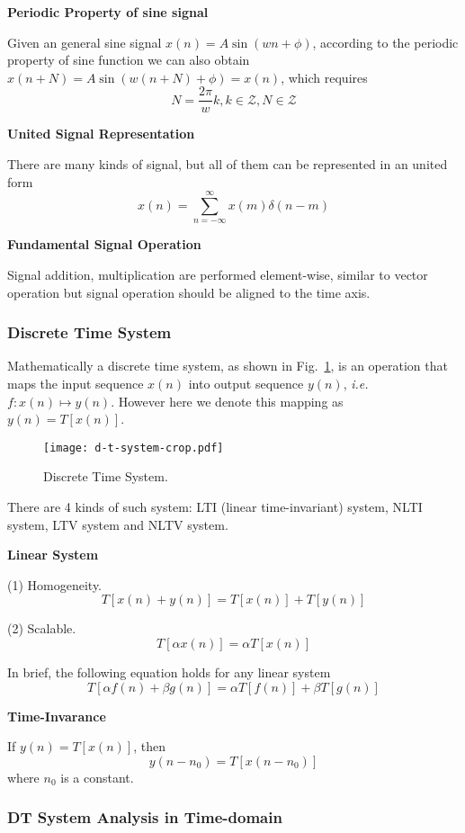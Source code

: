 {\bf Periodic Property of sine signal}

Given an general sine signal $x(n) = A\sin(wn+\phi)$, according to the periodic property
of sine function we can also obtain $x(n+N) = A\sin(w(n+N)+\phi) = x(n)$, which requires
\[ N = \frac{2\pi}{w}k, k \in \mathcal{Z}, N \in \mathcal{Z} \]

{\bf United Signal Representation}

There are many kinds of signal, but all of them can be represented in an united form
\[ x(n) = \sum_{n=-\infty}^\infty x(m)\delta(n-m) \]

{\bf Fundamental Signal Operation}

Signal addition, multiplication are performed element-wise, similar to
vector operation but signal operation should be aligned to the time axis.

\subsubsection{Discrete Time System}

Mathematically a discrete time system, as shown in Fig.~\ref{fig:d-t-system},
is an operation that maps the input sequence $x(n)$ into
output sequence $y(n)$, \emph{i.e.} $f: x(n) \mapsto y(n)$.
However here we denote this mapping as $y(n) = T[x(n)]$.

\begin{figure}[!h]
 \centering
 \texttt{[image: d-t-system-crop.pdf]}
 \label{fig:d-t-system}
 \caption{Discrete Time System.}
\end{figure}

There are 4 kinds of such system: LTI (linear time-invariant) system, NLTI system, 
LTV system and NLTV system.

{\bf Linear System}

(1) Homogeneity.
\[ T[x(n)+y(n)] = T[x(n)] + T[y(n)] \]

(2) Scalable.
\[ T[\alpha x(n)] = \alpha T[x(n)] \]

In brief, the following equation holds for any linear system
\[ T[\alpha f(n)+\beta g(n)] = \alpha T[f(n)] + \beta T[g(n)]\]

{\bf Time-Invarance}

If $y(n) = T[x(n)]$, then
\[ y(n-n_0) = T[x(n-n_0)]\]
where $n_0$ is a constant.

\subsubsection{DT System Analysis in Time-domain}

